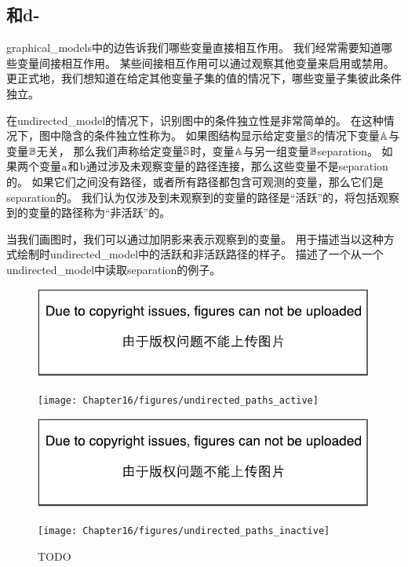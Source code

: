 \subsection{和d-}
\label{sec:separation_and_d_separation}

\gls{graphical_models}中的边告诉我们哪些变量直接相互作用。
我们经常需要知道哪些变量间接相互作用。 
某些间接相互作用可以通过观察其他变量来启用或禁用。
更正式地，我们想知道在给定其他变量子集的值的情况下，哪些变量子集彼此条件独立。


在\gls{undirected_model}的情况下，识别图中的条件独立性是非常简单的。 
在这种情况下，图中隐含的条件独立性称为。
如果图结构显示给定变量$\mathbb{S}$的情况下变量$\mathbb{A}$与变量$\mathbb{B}$无关，
那么我们声称给定变量$\mathbb{S}$时，变量$\mathbb{A}$与另一组变量$\mathbb{B}$\gls{separation}。
如果两个变量$\mathrm{a}$和$\mathrm{b}$通过涉及未观察变量的路径连接，那么这些变量不是\gls{separation}的。
如果它们之间没有路径，或者所有路径都包含可观测的变量，那么它们是\gls{separation}的。
我们认为仅涉及到未观察到的变量的路径是``活跃''的，将包括观察到的变量的路径称为``非活跃''的。


当我们画图时，我们可以通过加阴影来表示观察到的变量。
用于描述当以这种方式绘制时\gls{undirected_model}中的活跃和非活跃路径的样子。
描述了一个从一个\gls{undirected_model}中读取\gls{separation}的例子。


\begin{figure}[!htb]
\ifOpenSource
\centerline{\includegraphics{figure.pdf}}
\else
	\centerline{\texttt{[image: Chapter16/figures/undirected\_paths\_active]}}
\fi
\ifOpenSource
\centerline{\includegraphics{figure.pdf}}
\else
	\centerline{\texttt{[image: Chapter16/figures/undirected\_paths\_inactive]}}	
\fi
	\caption{TODO}
	\label{fig:undirected_paths_active}
\end{figure}

